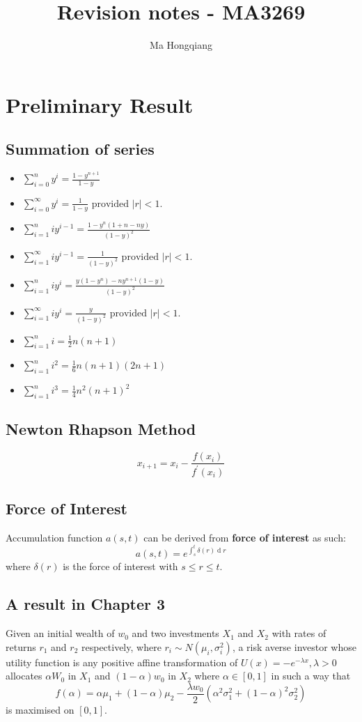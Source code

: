 \documentclass[12pt]{article}
\theoremstyle{definition}
\DeclareMathOperator{\diff}{d}
\begin{document}
\title{Revision notes - MA3269}
\author{Ma Hongqiang}
\maketitle
\tableofcontents

\clearpage
\section{Preliminary Result}
\subsection{Summation of series}
\begin{itemize}
  \item $\sum_{i=0}^n y^i = \frac{1-y^{n+1}}{1-y}$
  \item $\sum_{i=0}^\infty y^i = \frac{1}{1-y}\text{ provided }|r|<1$.
  \item $\sum_{i=1}^n iy^{i-1} = \frac{1-y^n(1+n-ny)}{(1-y)^2}$
  \item $\sum_{i=1}^\infty iy^{i-1} = \frac{1}{(1-y)^2}\text{ provided }|r|<1$.
  \item $\sum_{i=1}^n iy^{i} = \frac{y(1-y^n)-ny^{n+1}(1-y)}{(1-y)^2}$
  \item $\sum_{i=1}^\infty iy^{i} = \frac{y}{(1-y)^2}\text{ provided }|r|<1$.  
  \item $\sum_{i=1}^n i = \frac{1}{2}n(n+1)$
  \item $\sum_{i=1}^n i^2 = \frac{1}{6}n(n+1)(2n+1)$
  \item $\sum_{i=1}^n i^3 = \frac{1}{4}n^2(n+1)^2$
\end{itemize}
\subsection{Newton Rhapson Method}
\[
x_{i+1} = x_i-\frac{f(x_i)}{f^\prime(x_i)}
\]
\subsection{Force of Interest}
Accumulation function $a(s,t)$ can be derived from \textbf{force of interest} as such:
\[
a(s,t) = e^{\int_s^t \delta(r)\diff r}
\]
where $\delta(r)$ is the force of interest with $s\leq r\leq t$.
\subsection{A result in Chapter 3}
Given an initial wealth of $w_0$ and two investments $X_1$ and $X_2$ with rates of returns $r_1$ and $r_2$ respectively, where $r_i\sim N(\mu_i, \sigma_i^2)$, a risk averse investor whose utility function is any positive affine transformation of $U(x)=-e^{-\lambda x}, \lambda>0$ allocates $\alpha W_0$ in $X_1$ and $(1-\alpha)w_0$ in $X_2$ where $\alpha\in[0,1]$ in such a way that
\[
f(\alpha)=\alpha\mu_1+(1-\alpha)\mu_2-\frac{\lambda w_0}{2}(\alpha^2\sigma_1^2+(1-\alpha)^2\sigma_2^2)
\]
is maximised on $[0,1]$.
\clearpage
\end{document}
